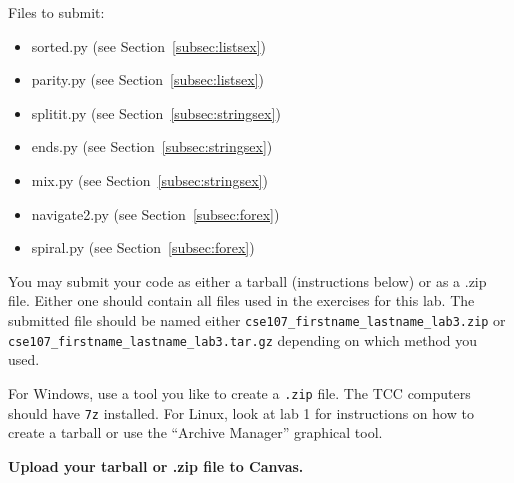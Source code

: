 \documentclass[11pt]{cselabheader}
\begin{document}
Files to submit:
\begin{itemize}
  \item sorted.py (see Section~\ref{subsec:listsex})
  \item parity.py (see Section~\ref{subsec:listsex})
  \item splitit.py (see Section~\ref{subsec:stringsex})
  \item ends.py (see Section~\ref{subsec:stringsex})
  \item mix.py (see Section~\ref{subsec:stringsex})
  \item navigate2.py (see Section~\ref{subsec:forex})
  \item spiral.py (see Section~\ref{subsec:forex})
\end{itemize}

You may submit your code as either a tarball (instructions below) or as a .zip
file. Either one should contain all files used in the exercises for this lab.
The submitted file should be named either
\texttt{cse107\_firstname\_lastname\_lab3.zip} or
\texttt{cse107\_firstname\_lastname\_lab3.tar.gz} depending on which method you
used.

For Windows, use a tool you like to create a \texttt{.zip} file. The TCC
computers should have \texttt{7z} installed. For Linux, look at lab 1 for
instructions on how to create a tarball or use the ``Archive Manager'' graphical
tool.

\begin{center}
  \textbf{Upload your tarball or .zip file to Canvas.}
\end{center}
\end{document}
